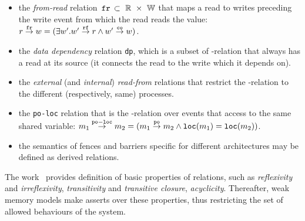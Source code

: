 \begin{itemize}

    \item the \textit{from-read} relation $\,\mathtt{fr}\, \subset~\mathbb{R}~\times~\mathbb{W}$ that maps a read to writes preceding the write event from which the read reads the value: \\
    $r \overset{\mathtt{fr}}{\rightarrow} w = (\exists w' . w' \overset{\mathtt{rf}}{\rightarrow} r \land w' \overset{\mathtt{co}}{\rightarrow} w)$.

    \item the \textit{data dependency} relation \texttt{dp}, which is a subset of \po-relation that always has a read at its source (it connects the read to the write which it depends on).

    \item the \textit{external} (and \textit{internal}) \textit{read-from} relations that restrict the \rf-relation to the different (respectively, same) processes.

    \item the \texttt{po-loc} relation that is the \po-relation over events that access to the same shared variable:
    $m_1 \overset{\mathtt{po-loc}}{\rightarrow} m_2 = (m_1 \overset{\mathtt{po}}{\rightarrow} m_2 \land \mathtt{loc}(m_1) = \mathtt{loc}(m_2))$.

    \item the semantics of fences and barriers specific for different architectures may be defined as derived relations.


\end{itemize}

The work~\cite[Chapter~2]{alglave2010shared} provides definition of basic properties of relations, such as \textit{reflexivity} and \textit{irreflexivity}, \textit{transitivity} and \textit{transitive closure}, \textit{acyclicity}.
Thereafter, weak memory models make asserts over these properties, thus restricting the set of allowed behaviours of the system.




